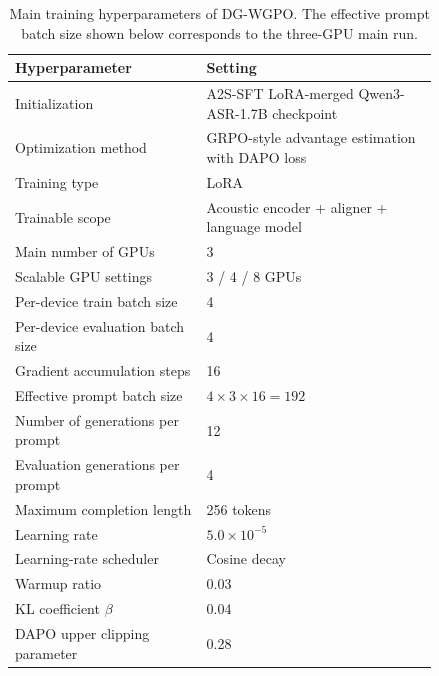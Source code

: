 \documentclass{article}
\begin{document}
\begin{table}[t]
\centering
\small
\caption{
Main training hyperparameters of DG-WGPO. The effective prompt batch size shown
below corresponds to the three-GPU main run.
}
\label{tab:dg_wgpo_train_hparams}
\begin{tabular}{p{0.38\linewidth} p{0.46\linewidth}}
\toprule
\textbf{Hyperparameter} & \textbf{Setting} \\
\midrule
Initialization
& A2S-SFT LoRA-merged Qwen3-ASR-1.7B checkpoint \\

Optimization method
& GRPO-style advantage estimation with DAPO loss \\

Training type
& LoRA \\

Trainable scope
& Acoustic encoder + aligner + language model \\

Main number of GPUs
& 3 \\

Scalable GPU settings
& 3 / 4 / 8 GPUs \\

Per-device train batch size
& 4 \\

Per-device evaluation batch size
& 4 \\

Gradient accumulation steps
& 16 \\

Effective prompt batch size
& $4 \times 3 \times 16 = 192$ \\

Number of generations per prompt
& 12 \\

Evaluation generations per prompt
& 4 \\

Maximum completion length
& 256 tokens \\

Learning rate
& $5.0 \times 10^{-5}$ \\

Learning-rate scheduler
& Cosine decay \\

Warmup ratio
& 0.03 \\

KL coefficient $\beta$
& 0.04 \\

DAPO upper clipping parameter
& 0.28 \\


\end{tabular}
\end{table}
\end{document}
